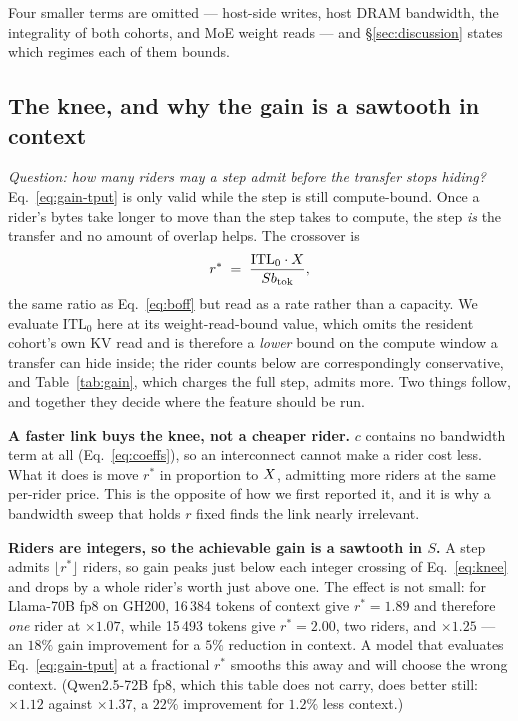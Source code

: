 Four smaller terms are omitted --- host-side writes, host DRAM bandwidth, the
integrality of both cohorts, and MoE weight reads --- and \S\ref{sec:discussion}
states which regimes each of them bounds.

\subsection{The knee, and why the gain is a sawtooth in context}
\label{sec:model:knee}

\emph{Question: how many riders may a step admit before the transfer stops hiding?}
Eq.~\ref{eq:gain-tput} is only valid while the step is still compute-bound. Once a
rider's bytes take longer to move than the step takes to compute, the step
\emph{is} the transfer and no amount of overlap helps. The crossover is
%
\begin{equation}
\label{eq:knee}
r^{*} \;=\; \frac{\mathrm{ITL}_0 \cdot X}{S b_{\mathrm{tok}}},
\end{equation}
%
the same ratio as Eq.~\ref{eq:boff} but read as a rate rather than a capacity. We
evaluate $\mathrm{ITL}_0$ here at its weight-read-bound value, which omits the
resident cohort's own KV read and is therefore a \emph{lower} bound on the compute
window a transfer can hide inside; the rider counts below are correspondingly
conservative, and Table~\ref{tab:gain}, which charges the full step, admits more.
Two things follow, and together they decide where the feature should be run.

\textbf{A faster link buys the knee, not a cheaper rider.} $c$ contains no
bandwidth term at all (Eq.~\ref{eq:coeffs}), so an interconnect cannot make a
rider cost less. What it does is move $r^{*}$ in proportion to $X$, admitting
more riders at the same per-rider price. This is the opposite of how we first
reported it, and it is why a bandwidth sweep that holds $r$ fixed finds the link
nearly irrelevant.

\textbf{Riders are integers, so the achievable gain is a sawtooth in $S$.} A step
admits $\lfloor r^{*} \rfloor$ riders, so gain peaks just below each integer
crossing of Eq.~\ref{eq:knee} and drops by a whole rider's worth just above one.
The effect is not small: for Llama-70B fp8 on GH200, 16\,384 tokens of context give
$r^{*} = 1.89$ and therefore \emph{one} rider at $\times 1.07$, while 15\,493
tokens give $r^{*} = 2.00$, two riders, and $\times 1.25$ --- an $18\%$ gain
improvement for a $5\%$ reduction in context. A model that evaluates
Eq.~\ref{eq:gain-tput} at a fractional $r^{*}$ smooths this away and will choose
the wrong context. (Qwen2.5-72B fp8, which this table does not carry, does better
still: $\times 1.12$ against $\times 1.37$, a $22\%$ improvement for $1.2\%$ less
context.)

